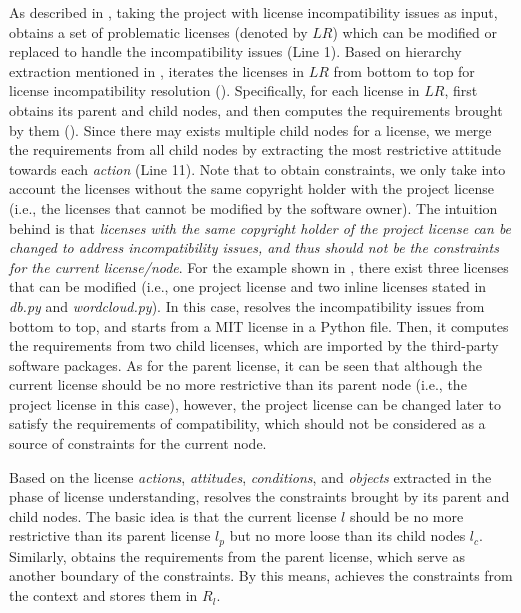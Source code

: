 As described in , 
{taking the project with license incompatibility issues as input,}
\tool obtains a set of problematic licenses (denoted by $LR$) which can be modified or replaced to handle the incompatibility issues (Line 1). Based on hierarchy extraction mentioned in , \tool iterates the licenses in $LR$ from bottom to 
top for license incompatibility resolution (). Specifically, for each license in $LR$, \tool first obtains its parent and child nodes, and then computes the requirements brought by them (). Since there may exists multiple child nodes for a license, we merge the requirements from all child nodes by extracting the most restrictive attitude towards each \textit{action} (Line 11). Note that to obtain constraints, we only take into account the licenses without the same copyright holder with the project license (i.e., the licenses that cannot be modified by the software owner). The intuition behind is that \textit{licenses with the same copyright holder of the project license can be changed to address incompatibility issues, and thus should not be the constraints for the current license/node}. For the example shown in , there exist three licenses that can be modified (i.e., one project license and two inline licenses stated in \textit{db.py} and \textit{wordcloud.py}). In this case, \tool resolves the incompatibility issues from bottom to top, and starts from a MIT license in a Python file. Then, it computes the requirements from two child licenses, which are imported by the third-party software packages. As for the parent license, it can be seen that although the current license should be no more restrictive than its parent node (i.e., the project license in this case), however, the project license can be changed later to satisfy the requirements of compatibility, which should not be considered as a source of constraints for the current node. 


Based on the license \textit{actions}, \textit{attitudes}, \textit{conditions}, and \textit{objects} extracted in the phase of license understanding, \tool resolves the constraints brought by its parent and child nodes. The basic idea is that the current license $l$ should be no more restrictive than its parent license $l_p$ but no more loose than its child nodes $l_c$. 
 Similarly, \tool obtains the requirements from the parent license, which serve as another boundary of the constraints. By this means, \tool achieves the constraints from the context and stores them in $R_l$.

